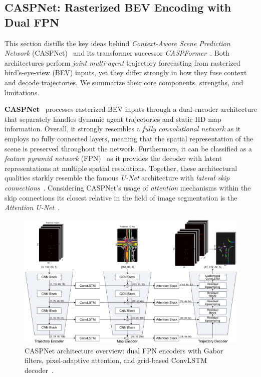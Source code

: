 \subsection{CASPNet: Rasterized BEV Encoding with Dual FPN}
\label{ssec:caspnet}

This section distills the key ideas behind \emph{Context-Aware Scene Prediction Network} (CASPNet)~\cite{caspnetSchäfer2022} and its transformer successor \emph{CASPFormer}~\cite{caspformerYadav2024}. Both architectures perform \emph{joint multi-agent} trajectory forecasting from rasterized bird's-eye-view (BEV) inputs, yet they differ strongly in how they fuse context and decode trajectories. We summarize their core components, strengths, and limitations.

\textbf{CASPNet}~\cite{caspnetSchäfer2022} processes rasterized BEV inputs through a dual-encoder architecture that separately handles dynamic agent trajectories and static HD map information. Overall, it strongly resembles a \emph{fully convolutional network} as it employs no fully connected layers, meaning that the spatial representation of the scene is preserved throughout the network. Furthermore, it can be classified as a \emph{feature pyramid network} (FPN)~\cite{FPNLin2017} as it provides the decoder with latent representations at multiple spatial resolutions. Together, these architectural qualities starkly resemble the famous \emph{U-Net} architecture with \emph{lateral skip connections}~\cite{UNetLSRonneberger2015}. Considering CASPNet's usage of \emph{attention} mechanisms within the skip connections its closest relative in the field of image segmentation is the \emph{Attention U-Net}~\cite{UNetAttnOktay2018}.

\begin{figure}[ht]
  \centering
  \includegraphics[width=\linewidth]{figures/caspnet_arch.png}
  \caption{CASPNet architecture overview: dual FPN encoders with Gabor filters, pixel-adaptive attention, and grid-based ConvLSTM decoder~\cite{caspnetSchäfer2022}.}
  \label{fig:caspnet_overview}
\end{figure}

